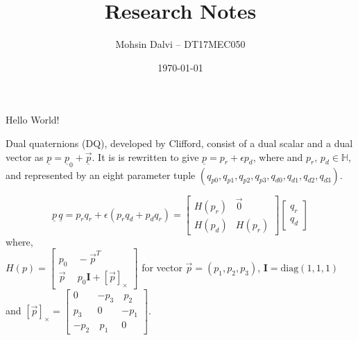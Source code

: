\documentclass[runningheads, 11pt]{article}
\begin{document}
	
\title{Research Notes}
\author{Mohsin Dalvi -- DT17MEC050}
\date{\today}
\maketitle


	
Hello World! \cite{lentin2019}

Dual quaternions (DQ), developed by Clifford, consist of a dual scalar and a dual vector as $ \underline{p} = \underline{p}_0 + \underline{\vec{p}} $. It is is rewritten to give $ \underline{p} = p_r + \epsilon p_d $, where 
and $ p_r ,\, p_d \in \mathbb{H} $, and represented by an eight parameter tuple $( q_{p0}, q_{p1}, q_{p2}, q_{p3}, q_{d0}, q_{d1}, q_{d2}, q_{d3} ) $.

\begin{equation}\label{eq:dqmult}
\underline{p} \, \underline{q} = p_{r} q_{r} + \epsilon ( p_{r} q_{d} + p_{d} q_{r} ) =  \begin{bmatrix} H \left( p_r \right) & \vec{0} \\ H \left( p_d \right) & H \left( p_r \right) \end{bmatrix}  \begin{bmatrix} q_r \\ q_d \end{bmatrix}
\end{equation} 
where, \\
$ H \left( p \right) = \begin{bmatrix} p_0 & \ -\vec{p}^T \\ \vec{p} & \ p_0 \bm{I} + \left[\vec{p}\right]_\times  \end{bmatrix} $ for vector $ \vec{p} = \left( p_1, p_2, p_3 \right) $, $ \bm{I} = \text{diag} \left( 1, 1, 1 \right) $  and $ \left[\vec{p}\right]_\times = \begin{bmatrix} 0 & -p_3 &\ p_2 \\ p_3 & 0 & -p_1 \\ -p_2 &\ p_1 & 0 \end{bmatrix}$.
\end{document}
